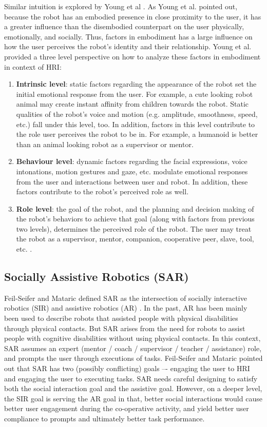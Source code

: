 \documentclass{ut-thesis}
\begin{document}
Similar intuition is explored by Young et al \cite{young2011evaluating}.  As Young et al. pointed out, because the robot has an embodied presence in close proximity to the user, it has a greater influence than the disembodied counterpart on the user physically, emotionally, and socially. Thus, factors in embodiment has a large influence on how the user perceives the robot's identity and their relationship.  Young et al. provided a three level perspective on how to analyze these factors in embodiment in context of HRI:
\begin{enumerate}
	\item \textbf{Intrinsic level}: static factors regarding the appearance of the robot set the initial emotional response from the user.  For example, a cute looking robot animal may create instant affinity from children towards the robot.  Static qualities of the robot's voice and motion (e.g. amplitude, smoothness, speed, etc.) fall under this level, too.  In addition, factors in this level contribute to the role user perceives the robot to be in.  For example, a humanoid is better than an animal looking robot as a supervisor or mentor.

	\item \textbf{Behaviour level}: dynamic factors regarding the facial expressions, voice intonations, motion gestures and gaze, etc. modulate emotional responses from the user and interactions between user and robot.  In addition, these factors contribute to the robot's perceived role as well.

	\item \textbf{Role level}: the goal of the robot, and the planning and decision making of the robot's behaviors to achieve that goal (along with factors from previous two levels), determines the perceived role of the robot.  The user may treat the robot as a supervisor, mentor, companion, cooperative peer, slave, tool, etc. \cite{goodrich2007human}.
\end{enumerate}


\subsection{Socially Assistive Robotics (SAR)}
Feil-Seifer and Mataric defined SAR as the intersection of socially interactive robotics (SIR) and assistive robotics (AR) \cite{feil2005defining}.  In the past, AR has been mainly been used to describe robots that assisted people with physical disabilities through physical contacts.  But SAR arises from the need for robots to assist people with cognitive disabilities without using physical contacts.  In this context, SAR assumes an expert (mentor / coach / supervisor / teacher / assistance) role, and prompts the user through executions of tasks.  Feil-Seifer and Mataric pointed out that SAR has two (possibly conflicting) goals –- engaging the user to HRI and engaging the user to executing tasks.  SAR needs careful designing to satisfy both the social interaction goal and the assistive goal.  However, on a deeper level, the SIR goal is serving the AR goal in that, better social interactions would cause better user engagement during the co-operative activity, and yield better user compliance to prompts and ultimately better task performance.
\end{document}
